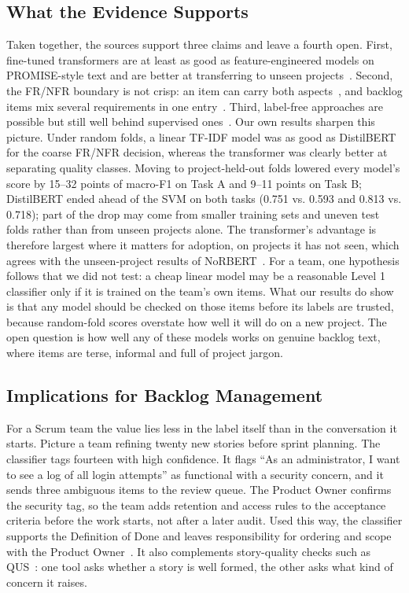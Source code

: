 \documentclass[conference,10pt,letterpaper]{IEEEtran}
\begin{document}
\subsection{What the Evidence Supports}
Taken together, the sources support three claims and leave a fourth open. First, fine-tuned transformers are at least as good as feature-engineered models on PROMISE-style text and are better at transferring to unseen projects~\cite{hey2020norbert,hey2022corrected}. Second, the FR/NFR boundary is not crisp: an item can carry both aspects~\cite{dalpiaz2019}, and backlog items mix several requirements in one entry~\cite{vancan2025}. Third, label-free approaches are possible but still well behind supervised ones~\cite{alhoshan2023,luo2022prcbert}. Our own results sharpen this picture. Under random folds, a linear TF-IDF model was as good as DistilBERT for the coarse FR/NFR decision, whereas the transformer was clearly better at separating quality classes. Moving to project-held-out folds lowered every model's score by 15–32 points of macro-F1 on Task A and 9–11 points on Task B; DistilBERT ended ahead of the SVM on both tasks (0.751 vs. 0.593 and 0.813 vs. 0.718); part of the drop may come from smaller training sets and uneven test folds rather than from unseen projects alone. The transformer's advantage is therefore largest where it matters for adoption, on projects it has not seen, which agrees with the unseen-project results of NoRBERT~\cite{hey2020norbert,hey2022corrected}. For a team, one hypothesis follows that we did not test: a cheap linear model may be a reasonable Level 1 classifier only if it is trained on the team's own items. What our results do show is that any model should be checked on those items before its labels are trusted, because random-fold scores overstate how well it will do on a new project. The open question is how well any of these models works on genuine backlog text, where items are terse, informal and full of project jargon.

\subsection{Implications for Backlog Management}
For a Scrum team the value lies less in the label itself than in the conversation it starts. Picture a team refining twenty new stories before sprint planning. The classifier tags fourteen with high confidence. It flags “As an administrator, I want to see a log of all login attempts” as functional with a security concern, and it sends three ambiguous items to the review queue. The Product Owner confirms the security tag, so the team adds retention and access rules to the acceptance criteria before the work starts, not after a later audit. Used this way, the classifier supports the Definition of Done and leaves responsibility for ordering and scope with the Product Owner~\cite{scrumguide2020}. It also complements story-quality checks such as QUS~\cite{lucassen2016qus}: one tool asks whether a story is well formed, the other asks what kind of concern it raises.
\end{document}
